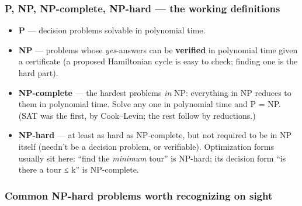 \documentclass[
  10pt,
  letterpaper,
  onecolumn]{article}
\providecommand{\tightlist}{%
  \setlength{\itemsep}{0pt}\setlength{\parskip}{0pt}}
\begin{document}
\hypertarget{p-np-np-complete-np-hard-the-working-definitions}{%
\subsubsection{P, NP, NP-complete, NP-hard --- the working
definitions}\label{p-np-np-complete-np-hard-the-working-definitions}}

\begin{itemize}
\tightlist
\item
  \textbf{P} --- decision problems solvable in polynomial time.
\item
  \textbf{NP} --- problems whose \emph{yes}-answers can be
  \textbf{verified} in polynomial time given a certificate (a proposed
  Hamiltonian cycle is easy to check; finding one is the hard part).
\item
  \textbf{NP-complete} --- the hardest problems \emph{in} NP: everything
  in NP reduces to them in polynomial time. Solve any one in polynomial
  time and P = NP. (SAT was the first, by Cook--Levin; the rest follow
  by reductions.)
\item
  \textbf{NP-hard} --- at least as hard as NP-complete, but not required
  to be in NP itself (needn't be a decision problem, or verifiable).
  Optimization forms usually sit here: ``find the \emph{minimum} tour''
  is NP-hard; its decision form ``is there a tour ≤ k'' is NP-complete.
\end{itemize}

\hypertarget{common-np-hard-problems-worth-recognizing-on-sight}{%
\subsubsection{Common NP-hard problems worth recognizing on
sight}\label{common-np-hard-problems-worth-recognizing-on-sight}}
\end{document}
